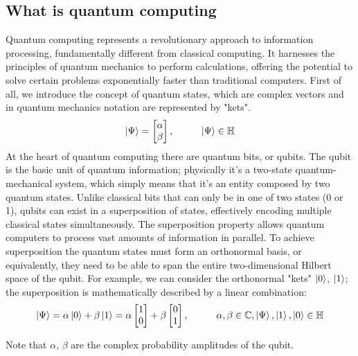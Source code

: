 \documentclass[12pt,oneside,a4paper]{article}
\begin{document}
\subsection{What is quantum computing}
Quantum computing represents a revolutionary approach to information processing, fundamentally different from classical computing. It harnesses the principles of quantum mechanics to perform calculations, offering the potential to solve certain problems exponentially faster than traditional computers.
First of all, we introduce the concept of quantum states, which are complex vectors and in quantum mechanics notation are represented by "kets". 
\begin{equation}
    \ket{\Psi} = \begin{bmatrix}
        \alpha\\
        \beta
    \end{bmatrix},
    \hspace{10 mm} \ket{\Psi} \in \mathbb{H}
\end{equation}
At the heart of quantum computing there are quantum bits, or qubits. 
The qubit is the basic unit of quantum information; physically it's a two-state quantum-mechanical system, which simply means that it's an entity composed by two quantum states.
Unlike classical bits that can only be in one of two states (0 or 1), qubits can exist in a superposition of states, effectively encoding multiple classical states simultaneously. The superposition property allows quantum computers to process vast amounts of information in parallel. To achieve superposition the quantum states must form an orthonormal basis, or equivalently, they need to be able to span the entire two-dimensional Hilbert space of the qubit. For example, we can consider the orthonormal "kets" $\ket{0}$, $\ket{1}$; the superposition is mathematically described by a linear combination: 
\begin{equation}
    \ket{\Psi} = \alpha \ket{0} + \beta \ket{1} = \alpha \begin{bmatrix} 1 \\ 0 \end{bmatrix} + \beta \begin{bmatrix} 0 \\ 1 \end{bmatrix},
    \hspace{10 mm} \alpha, \beta \in \mathbb{C}, \ket{\Psi}, \ket{1}, \ket{0} \in \mathbb{H}
\end{equation}

Note that $\alpha$, $\beta$ are the complex probability amplitudes of the qubit.
\end{document}
